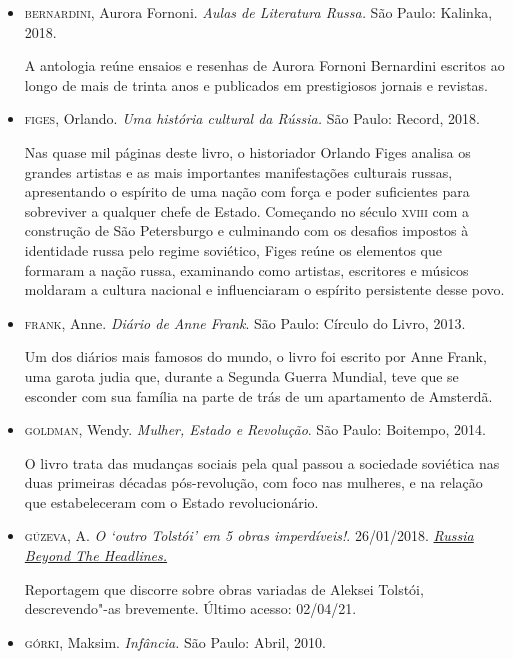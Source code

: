 \documentclass[11pt]{extarticle}
\begin{document}
\begin{itemize}

\item\textsc{bernardini}, Aurora Fornoni. \emph{Aulas de Literatura Russa.} São Paulo: Kalinka, 2018.

A antologia reúne ensaios e resenhas de Aurora Fornoni Bernardini
escritos ao longo de mais de trinta anos e publicados
em prestigiosos jornais e revistas.

\item\textsc{figes}, Orlando. \emph{Uma história cultural da Rússia.} São Paulo:
Record, 2018. 

Nas quase mil páginas deste livro, o historiador
Orlando Figes analisa os grandes artistas e as mais importantes
manifestações culturais russas, apresentando o espírito de uma nação com
força e poder suficientes para sobreviver a qualquer chefe de Estado.
Começando no século \textsc{xviii} com a construção de São Petersburgo e
culminando com os desafios impostos à identidade russa pelo regime
soviético, Figes reúne os elementos que formaram a nação russa,
examinando como artistas, escritores e músicos moldaram a cultura
nacional e influenciaram o espírito persistente desse povo.

\item\textsc{frank}, Anne. \emph{Diário de Anne Frank}. São Paulo: Círculo do Livro, 2013.

Um dos diários mais famosos do mundo, o livro foi escrito por Anne Frank, uma
garota judia que, durante a Segunda Guerra Mundial, teve que se esconder com sua família 
na parte de trás de um apartamento de Amsterdã. 

\item\textsc{goldman}, Wendy. \emph{Mulher, Estado e Revolução}. São Paulo: Boitempo,
2014.

O livro trata das mudanças sociais pela qual passou a sociedade
soviética nas duas primeiras décadas pós-revolução,
com foco nas mulheres, e na relação que estabeleceram com
o Estado revolucionário.

\item\textsc{gúzeva}, A. \emph{O `outro Tolstói' em 5 obras imperdíveis!}. 26/01/2018. 
\href{https://br.rbth.com/cultura/79816-o-outro-tolstoi-em-5-obras}{\emph{Russia Beyond
The Headlines.}}

Reportagem que discorre sobre obras variadas de Aleksei Tolstói,
descrevendo"-as brevemente. Último acesso: 02/04/21.

\item\textsc{górki}, Maksim. \emph{Infância.} São Paulo: Abril, 2010.


\end{itemize}
\end{document}
